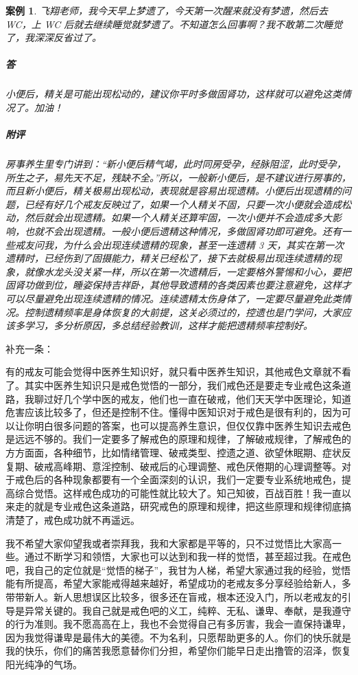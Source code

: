 \documentclass[fontset=founder]{ctexart}
\newtheorem{case}{案例}
\begin{document}
\begin{case}
    飞翔老师，我今天早上梦遗了，今天第一次醒来就没有梦遗，然后去 WC，上 WC 后就去继续睡觉就梦遗了。不知道怎么回事啊？我不敢第二次睡觉了，我深深反省过了。
    \subparagraph{答} 小便后，精关是可能出现松动的，建议你平时多做固肾功，这样就可以避免这类情况了。加油！
    \subparagraph{附评} 房事养生里专门讲到：“新小便后精气竭，此时同房受孕，经脉阻涩，此时受孕，所生之子，易先天不足，残缺不全。”所以，一般新小便后，是不建议进行房事的，而且新小便后，精关极易出现松动，表现就是容易出现遗精。小便后出现遗精的问题，已经有好几个戒友反映过了，如果一个人精关不固，只要一次小便就会造成松动，然后就会出现遗精。如果一个人精关还算牢固，一次小便并不会造成多大影响，也就不会出现遗精。一般小便后遗精这种情况，多做固肾功即可避免。还有一些戒友问我，为什么会出现连续遗精的现象，甚至一连遗精 3 天，其实在第一次遗精时，已经伤到了固摄能力，精关已经松了，接下去就极易出现连续遗精的现象，就像水龙头没关紧一样，所以在第一次遗精后，一定要格外警惕和小心，要把固肾功做到位，睡姿保持吉祥卧，其他导致遗精的各类因素也要注意避免，这样才可以尽量避免出现连续遗精的情况。连续遗精太伤身体了，一定要尽量避免此类情况。控制遗精频率是身体恢复的大前提，这关必须过的，控遗也是门学问，大家应该多学习，多分析原因，多总结经验教训，这样才能把遗精频率控制好。
\end{case}

补充一条：

有的戒友可能会觉得中医养生知识好，就只看中医养生知识，其他戒色文章就不看了。其实中医养生知识只是戒色觉悟的一部分，我们戒色还是要走专业戒色这条道路，我聊过好几个学中医的戒友，他们也一直在破戒，他们天天学中医理论，知道危害应该比较多了，但还是控制不住。懂得中医知识对于戒色是很有利的，因为可以让你明白很多问题的答案，也可以提高养生意识，但仅仅靠中医养生知识去戒色是远远不够的。我们一定要多了解戒色的原理和规律，了解破戒规律，了解戒色的方方面面，各种细节，比如情绪管理、破戒类型、控遗之道、欲望休眠期、症状反复期、破戒高峰期、意淫控制、破戒后的心理调整、戒色厌倦期的心理调整等。对于戒色后的各种现象都要有一个全面深刻的认识，我们一定要专业系统地戒色，提高综合觉悟。这样戒色成功的可能性就比较大了。知己知彼，百战百胜！我一直以来走的就是专业戒色这条道路，研究戒色的原理和规律，把这些原理和规律彻底搞清楚了，戒色成功就不再遥远。

我不希望大家仰望我或者崇拜我，我和大家都是平等的，只不过觉悟比大家高一些。通过不断学习和领悟，大家也可以达到和我一样的觉悟，甚至超过我。在戒色吧，我自己的定位就是“觉悟的梯子”，我甘为人梯，希望大家通过我的经验，觉悟能有所提高，希望大家能戒得越来越好，希望成功的老戒友多分享经验给新人，多带带新人。新人思想误区比较多，很多还在盲戒，根本还没入门，所以老戒友的引导是异常关键的。我自己就是戒色吧的义工，纯粹、无私、谦卑、奉献，是我遵守的行为准则。我不愿高高在上，我也不会觉得自己有多厉害，我会一直保持谦卑，因为我觉得谦卑是最伟大的美德。不为名利，只愿帮助更多的人。你们的快乐就是我的快乐，你们的痛苦我愿意替你们分担，希望你们能早日走出撸管的沼泽，恢复阳光纯净的气场。
\end{document}
